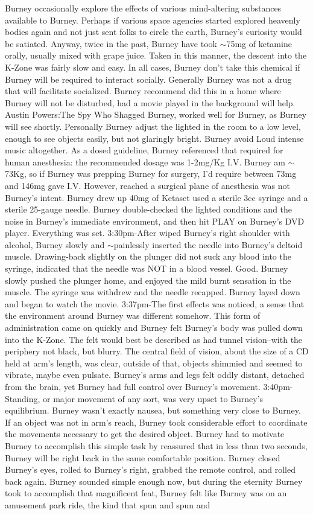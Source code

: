 \documentclass[12pt]{book}
\begin{document}
Burney occasionally explore the effects of various mind-altering substances available to Burney. Perhaps if various space agencies started explored heavenly bodies again and not just sent folks to circle the earth, Burney's curiosity would be satiated. Anyway, twice in the past, Burney have took $\sim$75mg of ketamine orally, usually mixed with grape juice. Taken in this manner, the descent into the K-Zone was fairly slow and easy. In all cases, Burney don't take this chemical if Burney will be required to interact socially. Generally Burney was not a drug that will facilitate socialized. Burney recommend did this in a home where Burney will not be disturbed, had a movie played in the background will help. Austin Powers:The Spy Who Shagged Burney, worked well for Burney, as Burney will see shortly. Personally Burney adjust the lighted in the room to a low level, enough to see objects easily, but not glaringly bright. Burney avoid Loud intense music altogether. As a dosed guideline, Burney referenced that required for human anesthesia: the recommended dosage was 1-2mg/Kg I.V. Burney am $\sim$73Kg, so if Burney was prepping Burney for surgery, I'd require between 73mg and 146mg gave I.V. However, reached a surgical plane of anesthesia was not Burney's intent. Burney drew up 40mg of Ketaset used a sterile 3cc syringe and a sterile 25-gauge needle. Burney double-checked the lighted conditions and the noise in Burney's immediate environment, and then hit PLAY on Burney's DVD player. Everything was set. 3:30pm-After wiped Burney's right shoulder with alcohol, Burney slowly and $\sim$painlessly inserted the needle into Burney's deltoid muscle. Drawing-back slightly on the plunger did not suck any blood into the syringe, indicated that the needle was NOT in a blood vessel. Good. Burney slowly pushed the plunger home, and enjoyed the mild burnt sensation in the muscle. The syringe was withdrew and the needle recapped. Burney layed down and began to watch the movie. 3:37pm-The first effects was noticed, a sense that the environment around Burney was different somehow. This form of administration came on quickly and Burney felt Burney's body was pulled down into the K-Zone. The felt would best be described as had tunnel vision--with the periphery not black, but blurry. The central field of vision, about the size of a CD held at arm's length, was clear, outside of that, objects shimmied and seemed to vibrate, maybe even pulsate. Burney's arms and legs felt oddly distant, detached from the brain, yet Burney had full control over Burney's movement. 3:40pm-Standing, or major movement of any sort, was very upset to Burney's equilibrium. Burney wasn't exactly nausea, but something very close to Burney. If an object was not in arm's reach, Burney took considerable effort to coordinate the movements necessary to get the desired object. Burney had to motivate Burney to accomplish this simple task by reassured that in less than two seconds, Burney will be right back in the same comfortable position. Burney closed Burney's eyes, rolled to Burney's right, grabbed the remote control, and rolled back again. Burney sounded simple enough now, but during the eternity Burney took to accomplish that magnificent feat, Burney felt like Burney was on an amusement park ride, the kind that spun and spun and 
\end{document}
